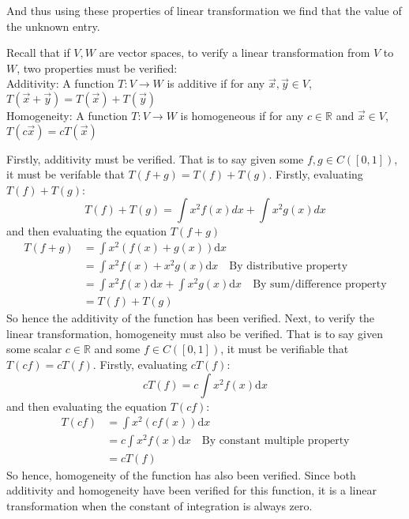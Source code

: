 \documentclass{report}
\begin{document}
And thus using these properties of linear transformation we find that the value of the unknown entry.
\begin{note}
Recall that if $V, W$ are vector spaces, to verify a linear transformation from $V$ to $W$, two properties must be verified: \\
Additivity: A function $T: V \rightarrow W$ is additive if for any $\vec{x},\vec{y}\in V$, $T(\vec{x} + \vec{y}) = T(\vec{x}) + T(\vec{y})$ \\
Homogeneity: A function $T: V \rightarrow W$ is homogeneous if for any $c\in\mathbb{R}$ and $\vec{x}\in V$, $T(c\vec{x}) = cT(\vec{x})$
\end{note}
\sol Firstly, additivity must be verified. That is to say given some $f,g\in C([0,1])$, it must be verifable that $T(f+g) = T(f) + T(g)$. Firstly, evaluating $T(f)+T(g)$:
$$
T(f) + T(g) =  \int{x^2f(x)dx} + \int{x^2g(x)dx}
$$
and then evaluating the equation $T(f+g)$
$$
\begin{aligned}
	T(f+g) & = \int{x^2(f(x) + g(x))\mathrm{d}x} \\
	& = \int{x^2f(x) + x^2g(x)\mathrm{d}x}\quad\text{By distributive property} \\
	& = \int{x^2f(x)\mathrm{d}x} + \int{x^2g(x)\mathrm{d}x}\quad\text{By sum/difference property} \\
	& = T(f) + T(g)
\end{aligned}
$$
So hence the additivity of the function has been verified.
\newpage
\noindent
Next, to verify the linear transformation, homogeneity must also be verified. That is to say given some scalar $c\in\mathbb{R}$ and some $f\in C([0,1])$, it must be verifiable that $T(cf) = cT(f)$. Firstly, evaluating $cT(f)$:
$$
cT(f) = c\int{x^2f(x)\mathrm{d}x}
$$
and then evaluating the equation $T(cf)$:
$$
\begin{aligned}
	T(cf) & = \int{x^2(cf(x))\mathrm{d}x} \\
	& = c\int{x^2f(x)\mathrm{d}x} \quad\text{By constant multiple property} \\
	& = cT(f)
\end{aligned}
$$
So hence, homogeneity of the function has also been verified. Since both additivity and homogeneity have been verified for this function, it is a linear transformation when the constant of integration is always zero. \\
\end{document}
